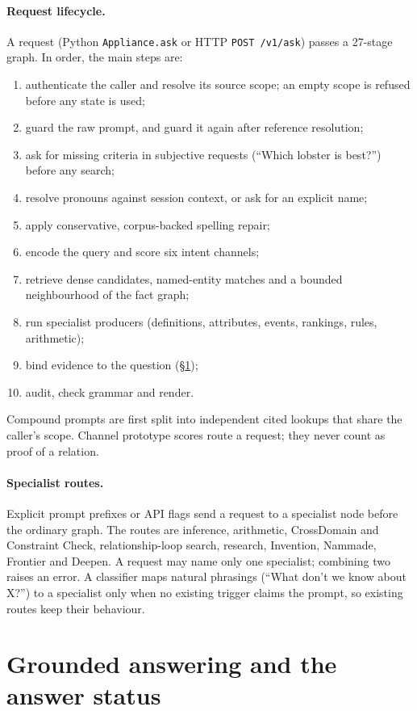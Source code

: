 \documentclass[11pt]{article}
\begin{document}
\paragraph{Request lifecycle.} A request (Python \texttt{Appliance.ask} or HTTP \texttt{POST /v1/ask}) passes a
27-stage graph. In order, the main steps are:
\begin{enumerate}
  \item authenticate the caller and resolve its source scope; an empty scope is refused before any state is used;
  \item guard the raw prompt, and guard it again after reference resolution;
  \item ask for missing criteria in subjective requests (``Which lobster is best?'') before any search;
  \item resolve pronouns against session context, or ask for an explicit name;
  \item apply conservative, corpus-backed spelling repair;
  \item encode the query and score six intent channels;
  \item retrieve dense candidates, named-entity matches and a bounded neighbourhood of the fact graph;
  \item run specialist producers (definitions, attributes, events, rankings, rules, arithmetic);
  \item bind evidence to the question (\S\ref{sec:status});
  \item audit, check grammar and render.
\end{enumerate}
Compound prompts are first split into independent cited lookups that share the caller's scope. Channel prototype
scores route a request; they never count as proof of a relation.

\paragraph{Specialist routes.} Explicit prompt prefixes or API flags send a request to a specialist node before
the ordinary graph. The routes are inference, arithmetic, CrossDomain and Constraint Check, relationship-loop
search, research, Invention, Nammade, Frontier and Deepen. A request may name only one specialist; combining two
raises an error. A classifier maps natural phrasings (``What don't we know about X?'') to a specialist only when no
existing trigger claims the prompt, so existing routes keep their behaviour.

\section{Grounded answering and the answer status}
\label{sec:status}
\end{document}

